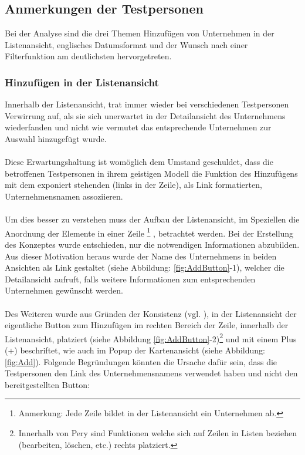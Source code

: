 \documentclass[Bachelorarbeit.tex]{subfiles}
\begin{document}
\subsection{Anmerkungen der Testpersonen}
Bei der Analyse sind die drei Themen Hinzufügen von Unternehmen in der Listenansicht, englisches Datumsformat und der Wunsch nach einer Filterfunktion am deutlichsten hervorgetreten.\\
\newpage
\subsubsection*{Hinzufügen in der Listenansicht}
Innerhalb der Listenansicht, trat immer wieder bei verschiedenen Testpersonen Verwirrung auf, als sie sich unerwartet in der Detailansicht des Unternehmens wiederfanden und nicht wie vermutet das entsprechende Unternehmen zur Auswahl hinzugefügt wurde.
\\
\\
Diese Erwartungshaltung ist womöglich dem Umstand geschuldet, dass die betroffenen Testpersonen in ihrem geistigen Modell die Funktion des Hinzufügens mit dem exponiert stehenden (links in der Zeile), als Link formatierten, Unternehmensnamen assoziieren. \\
\\
Um dies besser zu verstehen muss der Aufbau der Listenansicht, im Speziellen die Anordnung der Elemente in einer Zeile
\footnote
{
	Anmerkung: Jede Zeile bildet in der Listenansicht ein Unternehmen ab.
}
, betrachtet werden.
Bei der Erstellung des Konzeptes wurde entschieden, nur die notwendigen Informationen abzubilden. Aus dieser Motivation heraus wurde der Name des Unternehmens in beiden Ansichten als Link gestaltet (siehe Abbildung: \ref{fig:AddButton}-1), welcher die Detailansicht aufruft, falls weitere Informationen zum entsprechenden Unternehmen gewünscht werden.
\\
\\
Des Weiteren wurde aus Gründen der Konsistenz (vgl. \cite[S. 103, 11:4 Ensure Visual Consistency]{Koyani2004}), in der Listenansicht der eigentliche Button zum Hinzufügen im rechten Bereich der Zeile, innerhalb der Listenansicht, platziert (siehe Abbildung \ref{fig:AddButton}-2)\footnote{
	Innerhalb von Pery sind Funktionen welche sich auf Zeilen in Listen beziehen (bearbeiten, löschen, etc.) rechts platziert.
	} 
und mit einem Plus (+) beschriftet, wie auch im Popup der Kartenansicht (siehe Abbildung: \ref{fig:Add}).
\newpage
Folgende Begründungen könnten die Ursache dafür sein, dass die Testpersonen den Link des Unternehmensnamens verwendet haben und nicht den bereitgestellten Button:
\end{document}
